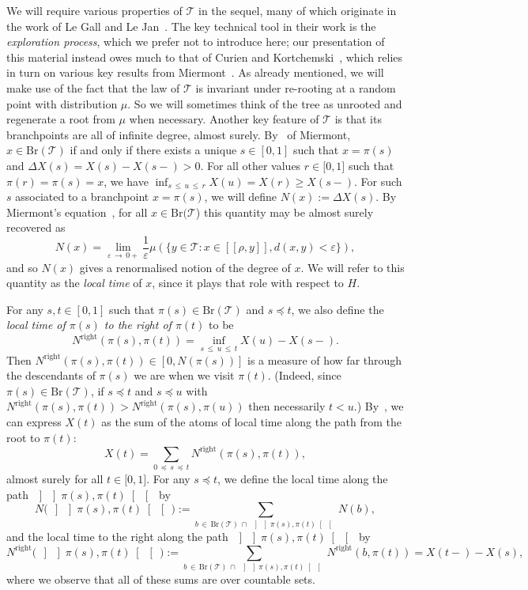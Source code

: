 \documentclass[10pt]{amsart}
\theoremstyle{definition}\newtheorem{defi}[theo]{Definition}\newtheorem{rema}[theo]{Remark}\newtheorem{exam}[theo]{Example}\newtheorem{exem}[theo]{Example}\newtheorem{nota}[theo]{Notation}
\newcommand{\intervalle}[4]{\mathopen{#1}#2
\mathclose{}\mathpunct{},#3
\mathclose{#4}}
\newcommand{\intervalleff}[2]{\intervalle{[}{#1}{#2}{]}}
\newcommand{\seg}[2]{\left[\! \left[#1, #2 \right] \! \right]}
\newcommand{\oseg}[2]{\, \left] \! \left] #1, #2 \right[\! \right[\,}
\newcommand{\Br}{\mathrm{Br}}
\newcommand{\Rightll}{\mathrm{right}}
\newcommand{\cT}{\mathcal{T}}
\begin{document}
We will require various properties of $\cT$ in the sequel, many of which originate in the work of Le Gall and Le Jan~\cite{LeGallLeJan}. The key technical tool in their work is the \emph{exploration process}, which we prefer not to introduce here; our presentation of this material instead owes much to that of Curien and Kortchemski~\cite{CRLoop13}, which relies in turn on various key results from Miermont~\cite{Mier05}. As already mentioned, we will make use of the fact that the law of $\cT$ is invariant under re-rooting at a random point with distribution $\mu$. So we will sometimes think of the tree as unrooted and regenerate a root from $\mu$ when necessary. Another key feature of $\cT$ is that its branchpoints are all of infinite degree, almost surely. By~\cite[Proposition~2]{Mier05} of Miermont, $x \in \Br(\cT)$ if and only if there exists a unique $s \in [0,1]$ such that $x = \pi(s)$ and $\Delta X(s) = X(s) - X(s-) > 0$. For all other values $r\in\intervalleff{0}{1}$ such that $\pi(r)=\pi(s)=x$, we have $\inf_{s\,\leq\,u\,\leq\,r} X(u)=X(r)\geq X(s-)$. For such $s$ associated to a branchpoint $x = \pi(s)$, we will define $N(x) := \Delta X(s)$. By Miermont's equation~\cite[Eq.~(1)]{Mier05}, for all $x \in \Br(\cT$) this quantity may be almost surely recovered as
\[
N(x) = \lim_{\varepsilon\,\to\,0+} \frac{1}{\varepsilon} \mu\left(\big\{y \in \cT:x \in \seg{\rho}{y}, d(x,y) < \varepsilon\big\}\right),
\]
and so $N(x)$ gives a renormalised notion of the degree of $x$. We will refer to this quantity as the \emph{local time} of $x$, since it plays that role with respect to $H$.

For any $s,t \in [0,1]$ such that $\pi(s) \in \Br(\cT)$ and $s \preceq t$, we also define the \emph{local time of $\pi(s)$ to the right of $\pi(t)$} to be
\[
N^{\Rightll}(\pi(s),\pi(t)) = \inf_{s\,\le\,u\,\le\,t} X(u) - X(s-).
\]
Then $N^{\Rightll}(\pi(s),\pi(t)) \in [0,N(\pi(s))]$ is a measure of how far through the descendants of $\pi(s)$ we are when we visit $\pi(t)$. (Indeed, since $\pi(s) \in \Br(\cT)$, if $s \preceq t$ and $s \preceq u$ with $N^{\Rightll}(\pi(s), \pi(t)) > N^{\Rightll}(\pi(s), \pi(u))$ then necessarily $t < u$.) By~\cite[Corollary~3.4]{CRLoop13}, we can express $X(t)$ as the sum of the atoms of local time along the path from the root to $\pi(t)$:
\begin{equation}\label{eq:local time on the right of the path from the root}
X(t)=\sum_{0\,\preceq\,s\,\preceq\,t} N^{\Rightll}(\pi(s),\pi(t)),
\end{equation}
almost surely for all $t\in\intervalleff{0}{1}$. For any $s \preceq t$, we define the local time along the path $\oseg{\pi(s)}{\pi(t)}$ by
\[
N\big(\oseg{\pi(s)}{\pi(t)}\big) := \sum_{b\,\in\, \Br(\cT)\,\cap\,\oseg{\pi(s)}{\pi(t)}} N(b),
\]
and the local time to the right along the path $\oseg{\pi(s)}{\pi(t)}$ by
\[
N^{\Rightll}\big(\oseg{\pi(s)}{\pi(t)}\big) := \sum_{b\,\in\,\Br(\cT)\,\cap\,\oseg{\pi(s)}{\pi(t)}} N^{\Rightll}(b,\pi(t)) = X(t-) - X(s),
\]
where we observe that all of these sums are over countable sets.
\end{document}

